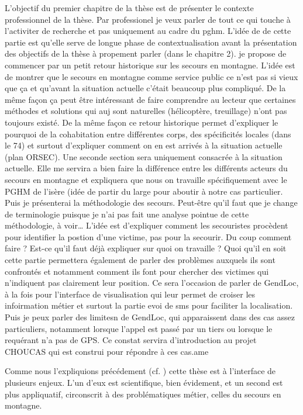 L'objectif du premier chapitre de la thèse est de présenter le
contexte professionnel de la thèse. Par professionel je veux parler de
tout ce qui touche à l'activiter de recherche et pas uniquement au
cadre du pghm. L'idée de de cette partie est qu'elle serve de longue
phase de contextualisation avant la présentation des objectifs de la
thèse à propement parler (dans le chapitre 2). je propose de commencer
par un petit retour historique sur les secours en montagne. L'idée est
de montrer que le secours en montagne comme service public ce n'est
pas si vieux que ça et qu'avant la situation actuelle c'était beaucoup
plus compliqué. De la même façon ça peut être intéressant de faire
comprendre au lecteur que certaines méthodes et solutions qui auj sont
naturelles (hélicoptère, treuillage) n'ont pas toujours existé. De la
même façon ce retour historique permet d'expliquer le pourquoi de la
cohabitation entre différentes corps, des spécificités locales (dans
le 74) et surtout d'expliquer comment on en est arrivés à la situation
actuelle (plan ORSEC). Une seconde section sera uniquement consacrée à
la situation actuelle. Elle me servira a bien faire la différence
entre les différents acteurs du secours en montagne et expliquera que
nous on travaille spécifiquement avec le PGHM de l'isère (idée de
partir du large pour aboutir à notre cas particulier. Puis je
présenterai la méthodologie des secours. Peut-être qu'il faut que je
change de terminologie puisque je n'ai pas fait une analyse pointue de
cette méthodologie, à voir… L'idée est d'expliquer comment les
secouristes procèdent pour identifier la postion d'une victime, pas
pour la secourir. Du coup comment faire ? Est-ce qu'il faut déjà
expliquer sur quoi on travaille ? Quoi qu'il en soit cette partie
permettera également de parler des problèmes auxquels ils sont
confrontés et notamment comment ils font pour chercher des victimes
qui n'indiquent pas clairement leur position. Ce sera l'occasion de
parler de GendLoc, à la fois pour l'interface de visualisation qui
leur permet de croiser les infoirmation métier et surtout la partie
evoi de sms pour faciliter la localisation. Puis je peux parler des
limitesn de GendLoc, qui apparaissent dans des cas assez particuliers,
notamment lorsque l'appel est passé par un tiers ou lorsque le
requérant n'a pas de GPS. Ce constat servira d'introduction au projet
CHOUCAS qui est construi pour répondre à ces cas.ame

Comme nous l'expliquions précédement (cf. ) cette
thèse est à l'interface de plusieurs enjeux. L'un d'eux est
scientifique, bien évidement, et un second est plus appliquatif,
circonscrit à des problématiques métier, celles du secours en
montagne.

